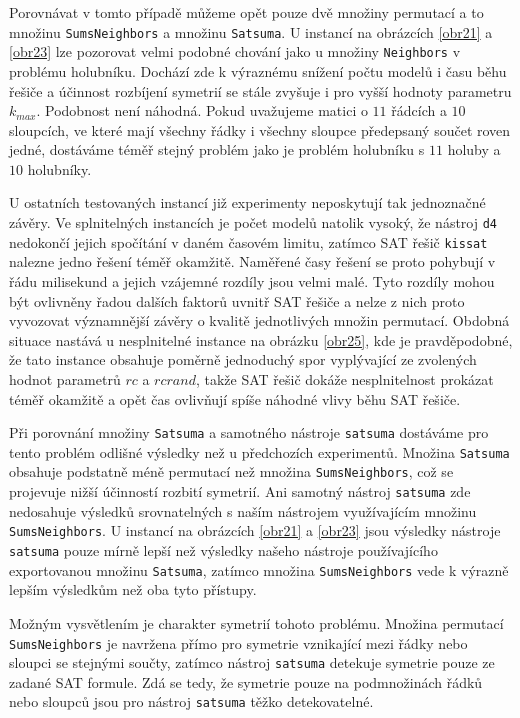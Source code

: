 Porovnávat v tomto případě můžeme opět pouze dvě množiny permutací a to množinu \texttt{SumsNeighbors} a množinu \texttt{Satsuma}. U instancí na obrázcích \ref{obr21} a \ref{obr23} lze pozorovat velmi podobné chování jako u množiny \texttt{Neighbors} v problému holubníku. Dochází zde k výraznému snížení počtu modelů i času běhu řešiče a účinnost rozbíjení symetrií se stále zvyšuje i pro vyšší hodnoty parametru $k_{max}$. Podobnost není náhodná. Pokud uvažujeme matici o $11$ řádcích a $10$ sloupcích, ve které mají všechny řádky i všechny sloupce předepsaný součet roven jedné, dostáváme téměř stejný problém jako je problém holubníku s $11$ holuby a $10$ holubníky. 

U ostatních testovaných instancí již experimenty neposkytují tak jednoznačné závěry. Ve splnitelných instancích je počet modelů natolik vysoký, že nástroj \texttt{d4} nedokončí jejich spočítání v daném časovém limitu, zatímco SAT řešič \texttt{kissat} nalezne jedno řešení téměř okamžitě. Naměřené časy řešení se proto pohybují v řádu milisekund a jejich vzájemné rozdíly jsou velmi malé. Tyto rozdíly mohou být ovlivněny řadou dalších faktorů uvnitř SAT řešiče a nelze z nich proto vyvozovat významnější závěry o kvalitě jednotlivých množin permutací. Obdobná situace nastává u nesplnitelné instance na obrázku \ref{obr25}, kde je pravděpodobné, že tato instance obsahuje poměrně jednoduchý spor vyplývající ze zvolených hodnot parametrů $rc$ a $rcrand$, takže SAT řešič dokáže nesplnitelnost prokázat téměř okamžitě a opět čas ovlivňují spíše náhodné vlivy běhu SAT řešiče.

Při porovnání množiny \texttt{Satsuma} a samotného nástroje \texttt{satsuma} dostáváme pro tento problém odlišné výsledky než u předchozích experimentů. Množina \texttt{Satsuma} obsahuje podstatně méně permutací než množina \texttt{SumsNeighbors}, což se projevuje nižší účinností rozbití symetrií. Ani samotný nástroj \texttt{satsuma} zde nedosahuje výsledků srovnatelných s naším nástrojem využívajícím množinu \texttt{SumsNeighbors}. U instancí na obrázcích \ref{obr21} a \ref{obr23} jsou výsledky nástroje \texttt{satsuma} pouze mírně lepší než výsledky našeho nástroje používajícího exportovanou množinu \texttt{Satsuma}, zatímco množina \texttt{SumsNeighbors} vede k výrazně lepším výsledkům než oba tyto přístupy.

Možným vysvětlením je charakter symetrií tohoto problému. Množina permutací \texttt{SumsNeighbors} je navržena přímo pro symetrie vznikající mezi řádky nebo sloupci se stejnými součty, zatímco nástroj \texttt{satsuma} detekuje symetrie pouze ze zadané SAT formule. Zdá se tedy, že symetrie pouze na podmnožinách řádků nebo sloupců jsou pro nástroj \texttt{satsuma} těžko detekovatelné.

